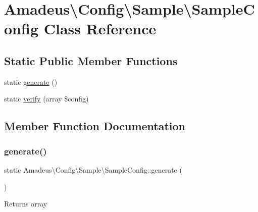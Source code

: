 \hypertarget{classAmadeus_1_1Config_1_1Sample_1_1SampleConfig}{}\section{Amadeus\textbackslash{}Config\textbackslash{}Sample\textbackslash{}Sample\+Config Class Reference}
\label{classAmadeus_1_1Config_1_1Sample_1_1SampleConfig}
\subsection*{Static Public Member Functions}
\begin{DoxyCompactItemize}
\item 
static \hyperlink{classAmadeus_1_1Config_1_1Sample_1_1SampleConfig_a45ff809c64b873aaf61bffb4e7f8946c}{generate} ()
\item 
static \hyperlink{classAmadeus_1_1Config_1_1Sample_1_1SampleConfig_a6c45fbfcd63a72ff7c7d869c58bd802f}{verify} (array \$config)
\end{DoxyCompactItemize}


\subsection{Member Function Documentation}
\mbox{\label{classAmadeus_1_1Config_1_1Sample_1_1SampleConfig_a45ff809c64b873aaf61bffb4e7f8946c}} 
\subsubsection{\texorpdfstring{generate()}{generate()}}
{\footnotesize\ttfamily static Amadeus\textbackslash{}\+Config\textbackslash{}\+Sample\textbackslash{}\+Sample\+Config\+::generate (\begin{DoxyParamCaption}{ }\end{DoxyParamCaption})\hspace{0.3cm}{\ttfamily [static]}}

\begin{DoxyReturn}{Returns}
array 
\end{DoxyReturn}
\mbox{\label{classAmadeus_1_1Config_1_1Sample_1_1SampleConfig_a6c45fbfcd63a72ff7c7d869c58bd802f}} 
